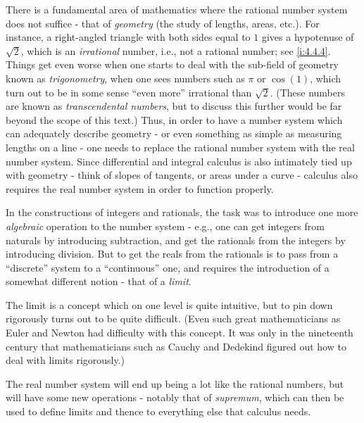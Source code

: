 \begin{note}
  There is a fundamental area of mathematics where the rational number system does not suffice - that of \emph{geometry}
  (the study of lengths, areas, etc.).
  For instance, a right-angled triangle with both sides equal to \(1\) gives a hypotenuse of \(\sqrt{2}\), which is an \emph{irrational} number, i.e., not a rational number;
  see \cref{i:4.4.4}.
  Things get even worse when one starts to deal with the sub-field of geometry known as \emph{trigonometry}, when one sees numbers such as \(\pi\) or \(\cos(1)\), which turn out to be in some sense ``even more'' irrational than \(\sqrt{2}\).
  (These numbers are known as \emph{transcendental numbers}, but to discuss this further would be far beyond the scope of this text.)
  Thus, in order to have a number system which can adequately describe geometry
  - or even something as simple as measuring lengths on a line
  - one needs to replace the rational number system with the real number system.
  Since differential and integral calculus is also intimately tied up with geometry
  - think of slopes of tangents, or areas under a curve
  - calculus also requires the real number system in order to function properly.
\end{note}

\begin{note}
  In the constructions of integers and rationals, the task was to introduce one more \emph{algebraic} operation to the number system
  - e.g., one can get integers from naturals by introducing subtraction, and get the rationals from the integers by introducing division.
  But to get the reals from the rationals is to pass from a ``discrete'' system to a ``continuous'' one, and requires the introduction of a somewhat different notion
  - that of a \emph{limit}.
\end{note}

\begin{note}
  The limit is a concept which on one level is quite intuitive, but to pin down rigorously turns out to be quite difficult.
  (Even such great mathematicians as Euler and Newton had difficulty with this concept.
  It was only in the nineteenth century that mathematicians such as Cauchy and Dedekind figured out how to deal with limits rigorously.)
\end{note}

\begin{note}
  The real number system will end up being a lot like the rational numbers, but will have some new operations
  - notably that of \emph{supremum}, which can then be used to define limits and thence to everything else that calculus needs.
\end{note}


